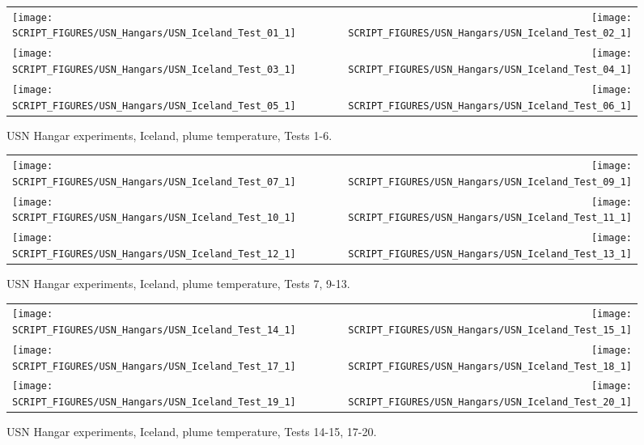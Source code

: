 \begin{figure}[h!]
\begin{tabular*}{\textwidth}{l@{\extracolsep{\fill}}r}
\texttt{[image: SCRIPT\_FIGURES/USN\_Hangars/USN\_Iceland\_Test\_01\_1]} &
\texttt{[image: SCRIPT\_FIGURES/USN\_Hangars/USN\_Iceland\_Test\_02\_1]} \\
\texttt{[image: SCRIPT\_FIGURES/USN\_Hangars/USN\_Iceland\_Test\_03\_1]} &
\texttt{[image: SCRIPT\_FIGURES/USN\_Hangars/USN\_Iceland\_Test\_04\_1]} \\
\texttt{[image: SCRIPT\_FIGURES/USN\_Hangars/USN\_Iceland\_Test\_05\_1]} &
\texttt{[image: SCRIPT\_FIGURES/USN\_Hangars/USN\_Iceland\_Test\_06\_1]} \\
\end{tabular*}
\caption[USN Hangar experiments, Iceland, plume temperature, Tests 1-6]
{USN Hangar experiments, Iceland, plume temperature, Tests 1-6.}
\label{USN_Plume_Iceland_1}
\end{figure}

\newpage

\begin{figure}[p]
\begin{tabular*}{\textwidth}{l@{\extracolsep{\fill}}r}
\texttt{[image: SCRIPT\_FIGURES/USN\_Hangars/USN\_Iceland\_Test\_07\_1]} &
\texttt{[image: SCRIPT\_FIGURES/USN\_Hangars/USN\_Iceland\_Test\_09\_1]} \\
\texttt{[image: SCRIPT\_FIGURES/USN\_Hangars/USN\_Iceland\_Test\_10\_1]} &
\texttt{[image: SCRIPT\_FIGURES/USN\_Hangars/USN\_Iceland\_Test\_11\_1]} \\
\texttt{[image: SCRIPT\_FIGURES/USN\_Hangars/USN\_Iceland\_Test\_12\_1]} &
\texttt{[image: SCRIPT\_FIGURES/USN\_Hangars/USN\_Iceland\_Test\_13\_1]} \\
\end{tabular*}
\caption[USN Hangar experiments, Iceland, plume temperature, Tests 7, 9-13]
{USN Hangar experiments, Iceland, plume temperature, Tests 7, 9-13.}
\label{USN_Plume_Iceland_2}
\end{figure}

\begin{figure}[p]
\begin{tabular*}{\textwidth}{l@{\extracolsep{\fill}}r}
\texttt{[image: SCRIPT\_FIGURES/USN\_Hangars/USN\_Iceland\_Test\_14\_1]} &
\texttt{[image: SCRIPT\_FIGURES/USN\_Hangars/USN\_Iceland\_Test\_15\_1]} \\
\texttt{[image: SCRIPT\_FIGURES/USN\_Hangars/USN\_Iceland\_Test\_17\_1]} &
\texttt{[image: SCRIPT\_FIGURES/USN\_Hangars/USN\_Iceland\_Test\_18\_1]} \\
\texttt{[image: SCRIPT\_FIGURES/USN\_Hangars/USN\_Iceland\_Test\_19\_1]} &
\texttt{[image: SCRIPT\_FIGURES/USN\_Hangars/USN\_Iceland\_Test\_20\_1]} \\
\end{tabular*}
\caption[USN Hangar experiments, Iceland, plume temperature, Tests 14-15, 17-20]
{USN Hangar experiments, Iceland, plume temperature, Tests 14-15, 17-20.}
\label{USN_Plume_Iceland_3}
\end{figure}

